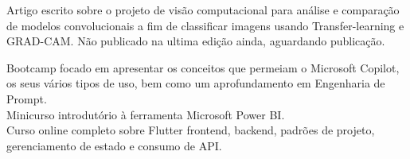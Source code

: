 \documentclass[
    10pt,
    english,
]{article}
\begin{document}

{Artigo escrito sobre o projeto de visão computacional para análise e comparação de modelos convolucionais a fim de classificar imagens usando Transfer-learning e GRAD-CAM. Não publicado na ultima edição ainda, aguardando publicação.}


{Bootcamp focado em apresentar os conceitos que permeiam o Microsoft Copilot, os seus vários tipos de uso, bem como um aprofundamento em Engenharia de Prompt.}
\\
\noindent {}
{Minicurso introdutório à ferramenta Microsoft Power BI.}
\\
\noindent {}
{Curso online completo sobre Flutter frontend, backend, padrões de projeto, gerenciamento de estado e consumo de API.}

\end{document}
